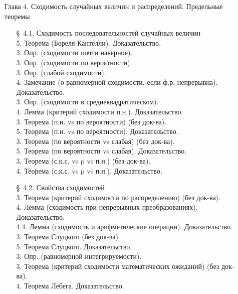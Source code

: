 \documentclass[10pt]{amsart}
\begin{document}
\begin{enumerate}
\begin{enumerate}
\end{enumerate}
    
    
\item[Глава 4.] Сходимость случайных величин и распределений. Предельные теоремы \\
\begin{enumerate}
\item[\S\, 4.1.] Сходимость последовательностей случайных величин \\
5. Теорема (Бореля-Кантелли). Доказательство. \\
3. Опр. (сходимости почти наверное). \\
3. Опр. (сходимости по вероятности). \\
3. Опр. (слабой сходимости). \\
4. Замечание (о равномерной сходимости, если ф.р. непрерывна). Доказательство. \\
3. Опр. (сходимости в среднеквадратическом). \\
4. Лемма (критерий сходимости п.н.). Доказательство. \\
3. Теорема (п.н. vs по вероятности)  (без док-ва). \\
5. Теорема (п.н. vs по вероятности). Доказательство. \\
3. Теорема (по вероятности vs слабая) (без док-ва). \\  
5. Теорема (по вероятности vs слабая). Доказательство. \\  
3. Теорема (с.к.с. vs p vs п.н.) (без док-ва). \\ 
4. Теорема (с.к.с. vs p vs п.н.). Доказательство. \\ 

        
        
\item[\S\, 4.2.] Свойства сходимостей \\
        
3. Теорема (критерий сходимости по распределению) (без док-ва). \\
4. Лемма  (сходимость при непрерывных преобразованиях). Доказательство. \\
4.4. Лемма (сходимость и арифметические операции). Доказательство. \\
3. Теорема Слуцкого (без док-ва). \\
5. Теорема Слуцкого. Доказательство. \\
3. Опр. (равномерной интегрируемости). \\
3. Теорема (критерий сходимости математических ожиданий) (без док-ва). \\
4. Теорема Лебега. Доказательство. \\


\end{enumerate}
\end{enumerate}
\end{document}
